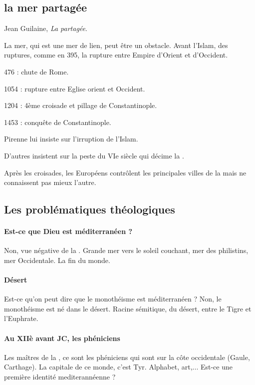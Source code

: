 \subsection{la mer partagée}

Jean Guilaine, \textit{La \Med partagée}.

La mer, qui est une mer de lien, peut être un obstacle. Avant l'Islam, des ruptures, comme en 395, la rupture entre Empire d'Orient et d'Occident. 

476 : chute de Rome.

1054 : rupture entre Eglise orient et Occident.

1204 : 4ème croisade et pillage de Constantinople.

1453 : conquête de Constantinople. 

Pirenne lui insiste sur l'irruption de l'Islam. 

D'autres insistent sur la peste du VIe siècle qui décime la \Med. 

Après les croisades, les Européens contrôlent les principales villes de la \Med mais ne connaissent pas mieux l'autre. 

\subsection{Les problématiques théologiques} 

\paragraph{Est-ce que Dieu est méditerranéen ?} Non, vue négative de la \Med. Grande mer vers le soleil couchant, mer des philistins, mer Occidentale. La fin du monde. 

\paragraph{Désert} Est-ce qu'on peut dire que le monothéisme est  méditerranéen ? Non, le monothéisme est né dans le désert. Racine sémitique, du désert, entre le Tigre et l'Euphrate.

\paragraph{Au XIIè avant JC, les phéniciens} Les maîtres de la \Med, ce sont les phéniciens qui sont sur la côte occidentale (Gaule, Carthage). La capitale de ce monde, c'est Tyr. Alphabet, art,... Est-ce une première identité mediterannéenne ? 

